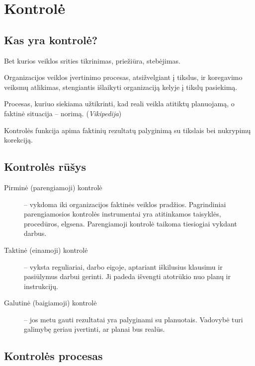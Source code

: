 \chapter{Kontrolė}

\section{Kas yra kontrolė?}

\begin{defn}[Kontrolė]
  Bet kurios veiklos srities tikrinimas, priežiūra, stebėjimas.
\end{defn}

\begin{defn}[Kontrolė]
  Organizacijos veiklos įvertinimo procesas, atsižvelgiant į tikslus,
  ir koregavimo veiksmų atlikimas, stengiantis išlaikyti organizaciją
  kelyje į tikslų pasiekimą.
\end{defn}

\begin{defn}[Kontrolė]
  Procesas, kuriuo siekiama užtikrinti, kad reali veikla atitiktų
  planuojamą, o faktinė situacija – norimą. (\emph{Vikipedija})
\end{defn}

Kontrolės funkcija apima faktinių rezultatų palyginimą su tikslais
bei nukrypimų korekciją.

\section{Kontrolės rūšys}

\begin{description}
  \item[Pirminė (parengiamoji) kontrolė] – vykdoma iki organizacijos
    faktinės veiklos pradžios. Pagrindiniai parengiamosios kontrolės
    instrumentai yra atitinkamos taisyklės, procedūros, elgsena.
    Parengiamoji kontrolė taikoma tiesiogiai vykdant darbus.
  \item[Taktinė (einamoji) kontrolė] – vyksta reguliariai, darbo
    eigoje, aptariant iškilusius klausimu ir pasiūlymus darbui
    gerinti. Ji padeda išvengti atotrūkio nuo planų ir instrukcijų.
  \item[Galutinė (baigiamoji) kontrolė] – jos metu gauti rezultatai
    yra palyginami su planuotais. Vadovybė turi galimybę geriau
    įvertinti, ar planai bus realūs.
\end{description}

\section{Kontrolės procesas}

